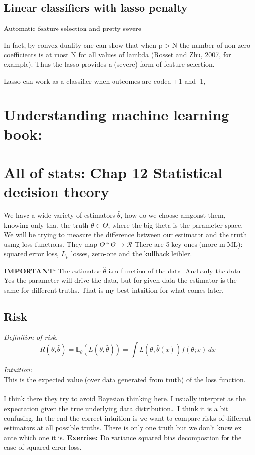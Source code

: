 \documentclass{article}
\begin{document}
\subsection{Linear classifiers with lasso penalty}
Automatic feature selection and pretty severe.

In fact, by convex duality one can show that when p > N the number of non-zero
coefficients is at most N for all values of lambda (Rosset and Zhu, 2007, for
example). Thus the lasso provides a (severe) form of feature selection.

Lasso can work as a classifier when outcomes are coded +1 and -1, 


\section{Understanding machine learning book:}

\section{All of stats: Chap 12 Statistical decision theory}

We have a wide variety of estimators $\hat{\theta}$, how do we choose amgonst them, knowing only that the truth $\theta \in \Theta$, where the big theta is
the parameter space. 
We will be trying to measure the difference between our estimator and the truth using loss functions.
They map $\Theta * \Theta \rightarrow \mathcal{R} $
There are 5 key ones (more in ML): squared error loss, $L_p$ losses, zero-one and the kullback leibler.

\textbf{IMPORTANT:} The estimator $\hat{\theta}$ is a function of the data. And only the data. Yes the parameter will drive the data,
but for given data the estimator is the same for different truths. That is my best intuition for what comes later.

\subsection{Risk}

\textit{Definition of risk:}
$$R(\theta,\hat{\theta}) = \mathbb{E}_{\theta} (L(\theta,\hat{\theta})) = \int L(\theta,\hat{\theta}(x)) f(\theta;x)  \,dx   $$

\textit{Intuition:}\\
This is the expected value (over data generated from truth) of the loss function.
\\\\
I think there they try to avoid Bayesian thinking here. I usually interpret as the expectation given  the true underlying data distribution\dots
I think it is a bit confusing. In the end the correct intuition is we want to compare risks of different estimators at 
all possible truths. There is only one truth but we don't know ex ante which one it is.
\textbf{Exercise:}
Do variance squared bias decompostion for the case of squared error loss.
\end{document}
